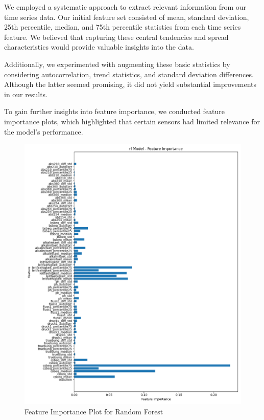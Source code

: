\documentclass{report}
\begin{document}
We employed a systematic approach to extract relevant information from our time series data. Our initial feature set consisted of mean, standard deviation, 25th percentile, median, and 75th percentile statistics from each time series feature. We believed that capturing these central tendencies and spread characteristics would provide valuable insights into the data.

Additionally, we experimented with augmenting these basic statistics by considering autocorrelation, trend statistics, and standard deviation differences. Although the latter seemed promising, it did not yield substantial improvements in our results.


To gain further insights into feature importance, we conducted feature importance plots, which highlighted that certain sensors had limited relevance for the model's performance.

\begin{figure}[H]
    \centering
    \includegraphics[width=1\textwidth]{feature_importance_plot.png}
    \caption{Feature Importance Plot for Random Forest}
    \label{fig:feature_importance_plot}
\end{figure}
\end{document}
